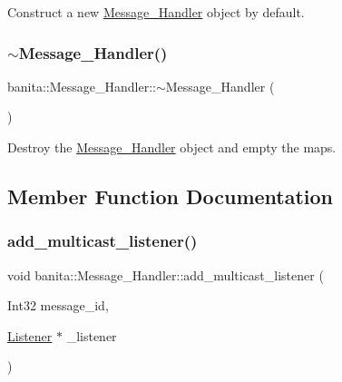 Construct a new \mbox{\hyperlink{classbanita_1_1_message___handler}{Message\+\_\+\+Handler}} object by default. 

\mbox{\label{classbanita_1_1_message___handler_afd3d620e8b639c50504fba6783e4e31f}} 
\subsubsection{\texorpdfstring{$\sim$Message\_Handler()}{~Message\_Handler()}}
{\footnotesize\ttfamily banita\+::\+Message\+\_\+\+Handler\+::$\sim$\+Message\+\_\+\+Handler (\begin{DoxyParamCaption}{ }\end{DoxyParamCaption})\hspace{0.3cm}{\ttfamily [inline]}}



Destroy the \mbox{\hyperlink{classbanita_1_1_message___handler}{Message\+\_\+\+Handler}} object and empty the maps. 



\subsection{Member Function Documentation}
\mbox{\label{classbanita_1_1_message___handler_a606a8f9a0c7fa63f74d53062a06a25fe}} 
\subsubsection{\texorpdfstring{add\_multicast\_listener()}{add\_multicast\_listener()}}
{\footnotesize\ttfamily void banita\+::\+Message\+\_\+\+Handler\+::add\+\_\+multicast\+\_\+listener (\begin{DoxyParamCaption}\item[{Int32}]{message\+\_\+id,  }\item[{\mbox{\hyperlink{structbanita_1_1_message___handler_1_1_listener}{Listener}} $\ast$}]{\+\_\+listener }\end{DoxyParamCaption})\hspace{0.3cm}{\ttfamily [inline]}}



